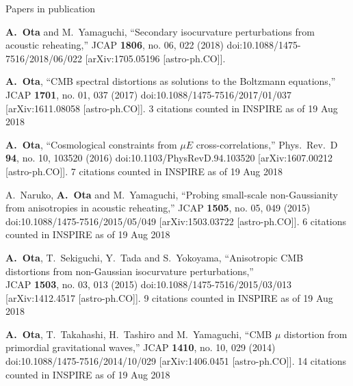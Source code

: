 \documentclass[a4paper]{resume} %
\begin{document}
\begin{rSection}{Papers in publication}
\begin{etaremune}
    \item 
  {\bf A.~Ota} and M.~Yamaguchi,
  ``Secondary isocurvature perturbations from acoustic reheating,''
  JCAP {\bf 1806}, no. 06, 022 (2018)
  doi:10.1088/1475-7516/2018/06/022
  [arXiv:1705.05196 [astro-ph.CO]].
  
    \item
  {\bf A.~Ota},
  ``CMB spectral distortions as solutions to the Boltzmann equations,''
  JCAP {\bf 1701}, no. 01, 037 (2017)
  doi:10.1088/1475-7516/2017/01/037
  [arXiv:1611.08058 [astro-ph.CO]].
  3 citations counted in INSPIRE as of 19 Aug 2018
  
    \item
  {\bf A.~Ota},
  ``Cosmological constraints from $\mu E$ cross-correlations,''
  Phys.\ Rev.\ D {\bf 94}, no. 10, 103520 (2016)
  doi:10.1103/PhysRevD.94.103520
  [arXiv:1607.00212 [astro-ph.CO]].
  7 citations counted in INSPIRE as of 19 Aug 2018

  \item
    A.~Naruko, {\bf A.~Ota} and M.~Yamaguchi,
  ``Probing small-scale non-Gaussianity from anisotropies in acoustic reheating,''
  JCAP {\bf 1505}, no. 05, 049 (2015)
  doi:10.1088/1475-7516/2015/05/049
  [arXiv:1503.03722 [astro-ph.CO]].
  6 citations counted in INSPIRE as of 19 Aug 2018
  
    \item
  {\bf A.~Ota}, T.~Sekiguchi, Y.~Tada and S.~Yokoyama,
  ``Anisotropic CMB distortions from non-Gaussian isocurvature perturbations,''\\
  JCAP {\bf 1503}, no. 03, 013 (2015)
  doi:10.1088/1475-7516/2015/03/013
  [arXiv:1412.4517 [astro-ph.CO]].
  9 citations counted in INSPIRE as of 19 Aug 2018
  
    \item 
      {\bf A.~Ota}, T.~Takahashi, H.~Tashiro and M.~Yamaguchi,
  ``CMB $\mu$ distortion from primordial gravitational waves,''
  JCAP {\bf 1410}, no. 10, 029 (2014)
  doi:10.1088/1475-7516/2014/10/029
  [arXiv:1406.0451 [astro-ph.CO]].
  14 citations counted in INSPIRE as of 19 Aug 2018
    
\end{etaremune}

\newpage
\end{rSection}
\end{document}
